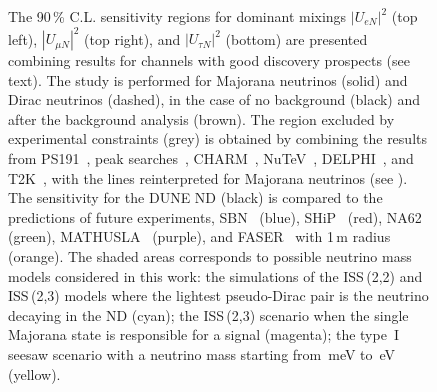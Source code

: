 \begin{figure}
	\centering
	\resizebox{0.49\linewidth}{!}{}
	\resizebox{0.49\linewidth}{!}{}

	\bigskip
	\resizebox{0.49\linewidth}{!}{}
	\caption[Combined sensitivity for dominant mixings for channels with good discovery prospects]%
		{The 90\,\% C.L. sensitivity regions for dominant mixings %
		$|U_{e N}|^2$ (top left), $|U_{\mu N}|^2$ (top right), and $|U_{\tau N}|^2$ (bottom) are presented %
		combining results for channels with good discovery prospects (see text).
		The study is performed for Majorana neutrinos (solid) and Dirac neutrinos (dashed), %
		in the case of no background (black) and after the background analysis (brown).
		The region excluded by experimental constraints (grey) is obtained by combining the results from
		PS191~\cite{Bernardi:1985ny, Bernardi:1987ek}, %
		peak searches~\cite{Artamonov:2014urb, Britton:1992pg, Britton:1992xv, Aguilar-Arevalo:2017vlf, Aguilar-Arevalo:2019owf}, %
		CHARM~\cite{Vilain:1994vg}, NuTeV~\cite{Vaitaitis:1999wq}, DELPHI~\cite{Abreu:1996pa}, and T2K~\cite{Abe:2019kgx}, %
		with the lines reinterpreted for Majorana neutrinos (see ).
		The sensitivity for the DUNE ND (black) is compared to the predictions of future experiments, %
		SBN~\cite{Ballett:2016opr} (blue), %
		SHiP~\cite{Alekhin:2015byh} (red), NA62~\cite{Drewes:2018irr} (green), MATHUSLA~\cite{Curtin:2018mvb} (purple), %
		and FASER~\cite{Kling:2018wct} with 1\,m radius (orange).
		The shaded areas corresponds to possible neutrino mass models considered in this work: %
		the simulations of the ISS\,(2,2) and ISS\,(2,3) models where the lightest %
		pseudo-Dirac pair is the neutrino decaying in the ND (cyan); %
		the ISS\,(2,3) scenario when the single Majorana state is responsible for a signal (magenta); %
		the type~I seesaw scenario with a neutrino mass starting from \,meV to \,eV (yellow).}
	\label{fig:sensAll}
\end{figure}

